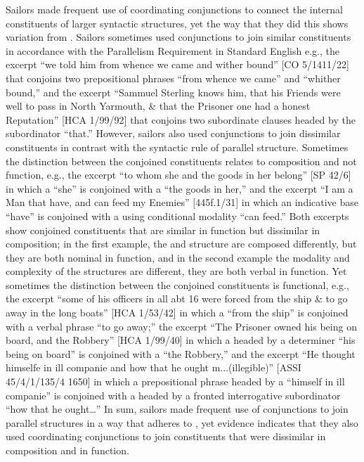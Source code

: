 Sailors made frequent use of coordinating conjunctions to connect the internal constituents of larger syntactic structures, yet the way that they did this shows variation from . Sailors sometimes used conjunctions to join similar constituents in accordance with the Parallelism Requirement in Standard English \citep[64-96,]{Osborne2006} e.g., the excerpt “we told him from whence we came and wither bound” [CO 5/1411/22] that conjoins two prepositional phrases “from whence we came” and “whither bound,” and the excerpt “Sammuel Sterling knows him, that his Friends were well to pass in North Yarmouth, \& that the Prisoner one had a honest Reputation” [HCA 1/99/92] that conjoins two subordinate clauses headed by the subordinator “that.” However, sailors also used conjunctions to join dissimilar constituents in contrast with the syntactic rule of parallel structure. Sometimes the distinction between the conjoined constituents relates to composition and not function, e.g., the excerpt “to whom she and the goods in her belong” [SP 42/6] in which a  “she” is conjoined with a  “the goods in her,” and the excerpt “I am a Man that have, and can feed my Enemies” [445f.1/31] in which an indicative base  “have” is conjoined with a  using conditional modality “can feed.” Both excerpts show conjoined constituents that are similar in function but dissimilar in composition; in the first example, the  and  structure are composed differently, but they are both nominal in function, and in the second example the modality and complexity of the  structures are different, they are both verbal in function. Yet sometimes the distinction between the conjoined constituents is functional, e.g., the excerpt “some of his officers in all abt 16 were forced from the ship \& to go away in the long boats” [HCA 1/53/42] in which a  “from the ship” is conjoined with a verbal  phrase “to go away;” the excerpt “The Prisoner owned his being on board, and the Robbery” [HCA 1/99/40] in which a  headed by a determiner “his being on board” is conjoined with a  “the Robbery,” and the excerpt “He thought himselfe in ill companie and how that he ought m...(illegible)” [ASSI 45/4/1/135/4 1650] in which a prepositional  phrase headed by a  “himself in ill companie” is conjoined with a  headed by a fronted interrogative subordinator “how that he ought…” In sum, sailors made frequent use of conjunctions to join parallel structures in a way that adheres to , yet evidence indicates that they also used coordinating conjunctions to join constituents that were dissimilar in composition and in function.  

